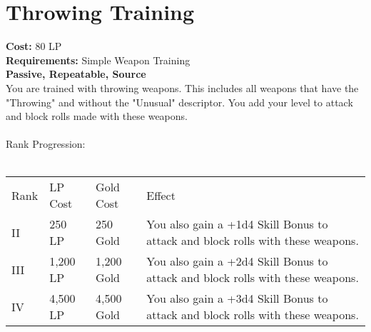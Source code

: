 \section{Throwing Training}\label{perk:throwingTraining}
\textbf{Cost:} 80 LP\\
\textbf{Requirements:} Simple Weapon Training\\
\textbf{Passive, Repeatable, Source}\\
You are trained with throwing weapons.
This includes all weapons that have the "Throwing" and without the "Unusual" descriptor.
You add your level to attack and block rolls made with these weapons.\\
\\
Rank Progression:\\
\\
\begin{longtable}{l | l | l | p{9cm}}
	Rank & LP Cost & Gold Cost & Effect\\
	II & 250 LP & 250 Gold & You also gain a +1d4 Skill Bonus to attack and block rolls with these weapons.\\
	III & 1,200 LP & 1,200 Gold & You also gain a +2d4 Skill Bonus to attack and block rolls with these weapons.\\
	IV & 4,500 LP & 4,500 Gold & You also gain a +3d4 Skill Bonus to attack and block rolls with these weapons.\\
\end{longtable}
